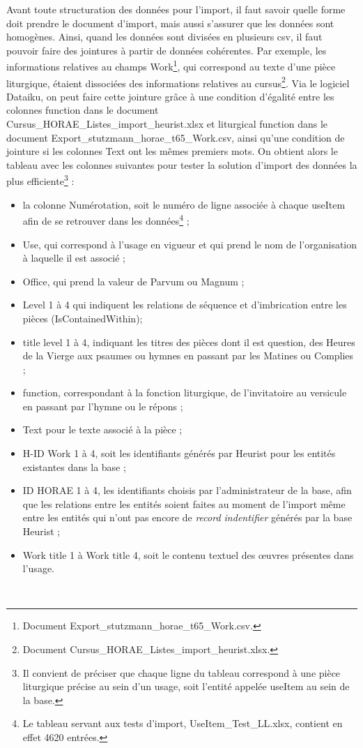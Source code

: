 \documentclass[a4paper,12pt,twoside]{book}
\begin{document}
	Avant toute structuration des données pour l'import, il faut savoir quelle forme doit prendre le document d'import, mais aussi s'assurer que les données sont homogènes. Ainsi, quand les données sont divisées en plusieurs csv, il faut pouvoir faire des jointures à partir de données cohérentes. Par exemple, les informations relatives au champs \og Work\fg{}\footnote{Document Export\_stutzmann\_horae\_t65\_Work.csv.}, qui correspond au texte d'une pièce liturgique, étaient dissociées des informations relatives au cursus\footnote{Document Cursus\_HORAE\_Listes\_import\_heurist.xlsx.}. Via le logiciel Dataiku, on peut faire cette jointure grâce à une condition d'égalité entre les colonnes \og function\fg{} dans le document Cursus\_HORAE\_Listes\_import\_heurist.xlsx et \og liturgical function\fg{} dans le document Export\_stutzmann\_horae\_t65\_Work.csv, ainsi qu'une condition de jointure si les colonnes \og Text\fg{} ont les mêmes premiers mots. On obtient alors le tableau avec les colonnes suivantes pour tester la solution d'import des données la plus efficiente\footnote{Il convient de préciser que chaque ligne du tableau correspond à une pièce liturgique précise au sein d'un usage, soit l'entité appelée \og useItem\fg{} au sein de la base.} : 
	\begin{itemize}
	    \item la colonne \og Numérotation\fg{}, soit le numéro de ligne associée à chaque useItem afin de se retrouver dans les données\footnote{Le tableau servant aux tests d'import, UseItem\_Test\_LL.xlsx, contient en effet 4620 entrées.} ;
	    \item \og Use\fg{}, qui correspond à l'usage en vigueur et qui prend le nom de l'organisation à laquelle il est associé ;
	    \item \og Office\fg{}, qui prend la valeur de \og Parvum\fg{} ou \og Magnum\fg{} ;
	    \item Level 1 à 4 qui indiquent les relations de séquence et d'imbrication entre les pièces (\og IsContainedWithin\fg{});
	    \item title level 1 à 4, indiquant les titres des pièces dont il est question, des Heures de la Vierge aux psaumes ou hymnes en passant par les Matines ou Complies ; 
	    \item \og function\fg{}, correspondant à la fonction liturgique, de l'invitatoire au versicule en passant par l'hymne ou le répons ;
	    \item \og Text\fg{} pour le texte associé à la pièce ;
	    \item H-ID Work 1 à 4, soit les identifiants générés par Heurist pour les entités existantes dans la base ;
	    \item ID HORAE 1 à 4, les identifiants choisis par l'administrateur de la base, afin que les relations entre les entités soient faites au moment de l'import même entre les entités qui n'ont pas encore de \textit{record indentifier} générés par la base Heurist ;
	    \item Work title 1 à Work title 4, soit le contenu textuel des œuvres présentes dans l'usage.
	\end{itemize}\\
	
\end{document}
